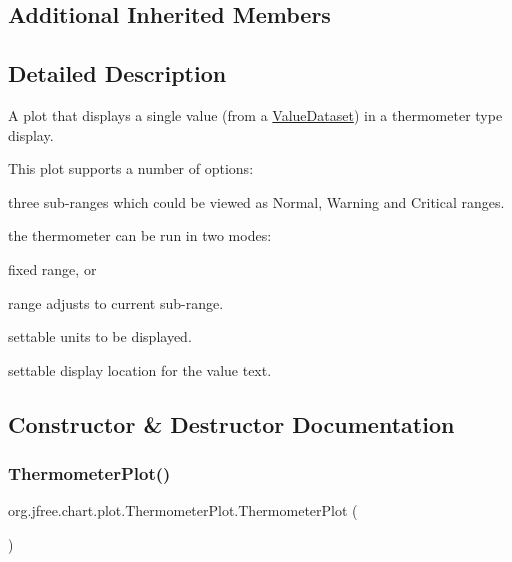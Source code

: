 \subsection*{Additional Inherited Members}


\subsection{Detailed Description}
A plot that displays a single value (from a \mbox{\hyperlink{}{Value\+Dataset}}) in a thermometer type display. 

This plot supports a number of options\+: 
\begin{DoxyEnumerate}
\item three sub-\/ranges which could be viewed as \textquotesingle{}Normal\textquotesingle{}, \textquotesingle{}Warning\textquotesingle{} and \textquotesingle{}Critical\textquotesingle{} ranges. 
\item the thermometer can be run in two modes\+: 
\begin{DoxyItemize}
\item fixed range, or 
\item range adjusts to current sub-\/range. 
\end{DoxyItemize}
\item settable units to be displayed. 
\item settable display location for the value text. 
\end{DoxyEnumerate}

\subsection{Constructor \& Destructor Documentation}
\mbox{\label{classorg_1_1jfree_1_1chart_1_1plot_1_1_thermometer_plot_a0f1a9f2ffb1315193355aafad2c95221}} 
\subsubsection{\texorpdfstring{Thermometer\+Plot()}{ThermometerPlot()}\hspace{0.1cm}{\footnotesize\ttfamily [1/2]}}
{\footnotesize\ttfamily org.\+jfree.\+chart.\+plot.\+Thermometer\+Plot.\+Thermometer\+Plot (\begin{DoxyParamCaption}{ }\end{DoxyParamCaption})}

